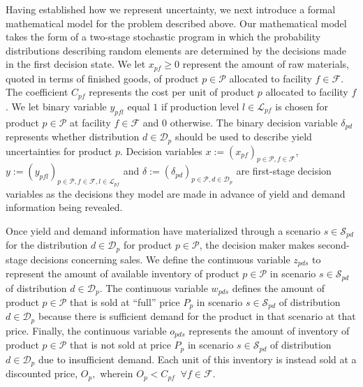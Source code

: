 \documentclass[12pt]{article}
\theoremstyle{thmstylethree}%
\begin{document}
Having established how we represent uncertainty, we next introduce a formal mathematical model for the problem described above. Our mathematical model takes the form of a two-stage stochastic program in which the probability distributions describing random elements are determined by the decisions made in the first decision state. 
We let  $x_{pf}\geq 0$ represent the amount of raw materials, quoted in terms of finished goods, of product $p \in \mathcal{P}$ allocated to facility $f \in \mathcal{F}$. The coefficient $C_{pf}$ represents the cost per unit of product $p$ allocated to facility $f$. We let binary variable $y_{pfl}$ equal $1$ if production level $l \in \mathcal{L}_{pf}$ is chosen for product $p \in \mathcal{P}$ at facility $f \in \mathcal{F}$  and $0$ otherwise.  The binary decision variable $\delta_{pd}$ represents whether distribution $d \in \mathcal{D}_{p}$ should be used to describe yield uncertainties for product $p$. Decision variables $x:=(x_{pf})_{p\in\mathcal{P},f\in\mathcal{F}}$, $y:=(y_{pfl})_{p\in\mathcal{P},f\in\mathcal{F},l \in \mathcal{L}_{pf}}$ and $\delta:=(\delta_{pd})_{p\in\mathcal{P},d\in\mathcal{D}_p}$ are first-stage decision variables as the decisions they model are made in advance of yield and demand information being revealed.


Once yield and demand information have materialized through a scenario $s\in\mathcal{S}_{pd}$ for the distribution $d\in\mathcal{D}_p$ for product $p\in\mathcal{P}$, the decision maker makes second-stage decisions concerning sales. We define the continuous variable $z_{pds}$ to represent the amount of available inventory of product $p \in \mathcal{P}$ in scenario $s \in \mathcal{S}_{pd}$ of distribution $d \in \mathcal{D}_{p}.$ The continuous variable $w_{pds}$ defines the amount of product $p \in \mathcal{P}$ that is sold at ``full'' price $P_{p}$ in scenario $s \in \mathcal{S}_{pd}$ of distribution $d \in \mathcal{D}_{p}$ because there is sufficient demand for the product in that scenario at that price. Finally, the continuous variable $o_{pds}$ represents the amount of inventory of product $p \in \mathcal{P}$ that is not sold at price $P_{p}$ in scenario $s \in \mathcal{S}_{pd}$ of distribution $d \in \mathcal{D}_{p}$ due to insufficient demand. Each unit of this inventory is instead sold at a discounted price, $O_p,$ wherein $O_p < C_{pf} \;\; \forall f \in \mathcal{F}.$ 
\end{document}
